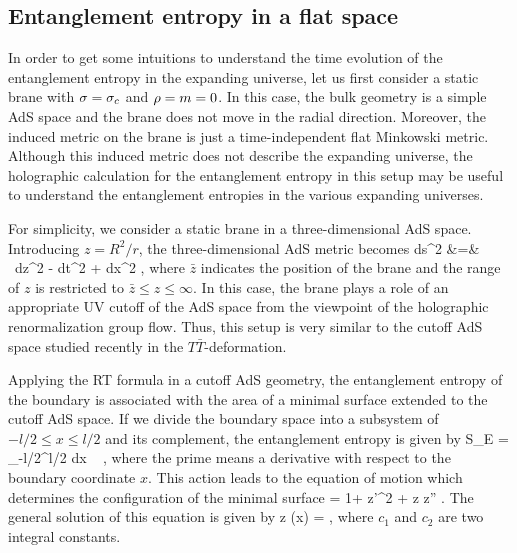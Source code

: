 \documentclass[12pt]{article}
\begin{document}
\subsection{Entanglement entropy in a flat space}

In order to get some intuitions to understand the time evolution of the entanglement entropy in the expanding universe, let us first consider a static brane with $\sigma=\sigma_c$ and $\rho=m=0$. In this case, the bulk geometry is a simple AdS space and the brane does not move in the radial direction. Moreover, the induced metric on the brane is just a time-independent flat Minkowski metric. Although this induced metric does not describe the expanding universe, the holographic calculation for the entanglement entropy in this setup may be useful to understand the entanglement entropies in the various expanding universes.

For simplicity, we consider a static brane in a three-dimensional AdS space. Introducing $z=R^2/r$, the three-dimensional AdS metric becomes
\be
ds^2 &=&   \ \ls dz^2 - dt^2 + dx^2  \rs  ,   
\ee
where $\bar{z}$ indicates the position of the brane and the range of $z$ is restricted to $\bar{z} \le z \le \infty$. In this case, the brane plays a role of an appropriate UV cutoff of the AdS space from the viewpoint of the holographic renormalization group flow. Thus, this setup is very similar to the cutoff AdS space studied recently in the $T \bar{T}$-deformation.

Applying the RT formula in a cutoff AdS geometry, the entanglement entropy of the boundary is associated with the area of a minimal surface extended to the cutoff AdS space. If we divide the boundary space into a subsystem of $-l/2 \le x \le l/2$ and its complement, the entanglement entropy is given by
\be				{}
S_E =  \int_{-l/2}^{l/2} dx \   ,
\ee
where the prime means a derivative with respect to the boundary coordinate $x$. This action leads to the equation of motion which determines the configuration of the minimal surface
 =  1+ z'^2 + z z'' .
\ee
The general solution of this equation is given by
\be
z (x) =  ,
\ee
where $c_1$ and $c_2$ are two integral constants. 
\end{document}
